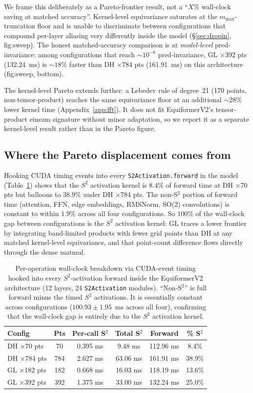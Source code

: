 \documentclass{article}
\begin{document}
We frame this deliberately as a Pareto-frontier result, not a
``$X\%$ wall-clock saving at matched accuracy''. Kernel-level
equivariance saturates at the $m_{\max}$-truncation floor and is
unable to discriminate between configurations that compound
per-layer aliasing very differently inside the model
(\S\ref{sec:dropin}, fig:sweep). The honest matched-accuracy
comparison is at \emph{model-level} pred-invariance: among
configurations that reach $\sim 10^{-6}$ pred-invariance,
GL ×392 pts (132.24~ms) is $\sim 18\%$ faster than DH ×784 pts
(161.91~ms) on this architecture (fig:sweep, bottom).

The kernel-level Pareto extends further: a Lebedev rule of degree~21
(170 points, non-tensor-product) reaches the same equivariance floor
at an additional $\sim$28\% lower kernel time
(Appendix~\ref{app:fft}). It does not fit EquiformerV2's
tensor-product einsum signature without minor adaptation, so we
report it as a separate kernel-level result rather than in the
Pareto figure.

\subsection{Where the Pareto displacement comes from}
Hooking CUDA timing events into every \texttt{S2Activation.forward} in
the model (Table~\ref{tab:breakdown}) shows that the $S^2$ activation
kernel is $8.4\%$ of forward time at DH ×70 pts but balloons to
$38.9\%$ under DH ×784 pts. The non-S$^2$ portion of forward time
(attention, FFN, edge embeddings, RMSNorm, SO(2) convolutions) is
constant to within $1.9\%$ across all four configurations. So
$100\%$ of the wall-clock gap between configurations is the
$S^2$ activation kernel: GL traces a lower frontier by integrating
band-limited products with fewer grid points than DH at any matched
kernel-level equivariance, and that point-count difference flows
directly through the dense matmul.

\begin{table}[t]
  \centering
  \caption{Per-operation wall-clock breakdown via CUDA-event timing
  hooked into every $S^2$-activation forward inside the EquiformerV2
  architecture (12 layers, 24 \texttt{S2Activation} modules).
  ``Non-S$^2$'' is full forward minus the timed $S^2$ activations. It
  is essentially constant across configurations
  ($100.93 \pm 1.95$~ms across all four), confirming that the
  wall-clock gap is entirely due to the $S^2$ activation kernel.}
  \label{tab:breakdown}
  \small
  \begin{tabular}{lccccc}
    \toprule
    Config & Pts & Per-call S$^2$ & Total S$^2$ & Forward & \% S$^2$ \\
    \midrule
    DH ×70 pts   & 70  & 0.395 ms & 9.48 ms  & 112.96 ms & 8.4\% \\
    DH ×784 pts  & 784 & 2.627 ms & 63.06 ms & 161.91 ms & 38.9\% \\
    GL ×182 pts  & 182 & 0.668 ms & 16.03 ms & 118.19 ms & 13.6\% \\
    GL ×392 pts  & 392 & 1.375 ms & 33.00 ms & 132.24 ms & 25.0\% \\
    \bottomrule
  \end{tabular}
\end{table}
\end{document}

